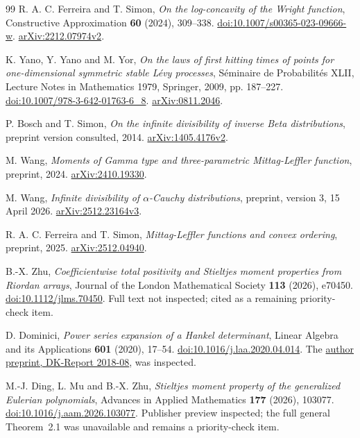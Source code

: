 \documentclass[11pt,a4paper]{article}
\theoremstyle{definition}
\theoremstyle{remark}
\numberwithin{equation}{section}
\begin{document}
\begin{thebibliography}{99}
R. A. C. Ferreira and T. Simon,
\emph{On the log-concavity of the Wright function},
Constructive Approximation \textbf{60} (2024), 309--338.
\href{https://doi.org/10.1007/s00365-023-09666-w}{doi:10.1007/s00365-023-09666-w}.
\href{https://arxiv.org/abs/2212.07974v2}{arXiv:2212.07974v2}.

K. Yano, Y. Yano and M. Yor,
\emph{On the laws of first hitting times of points for one-dimensional
symmetric stable L\'evy processes},
S\'eminaire de Probabilit\'es XLII, Lecture Notes in Mathematics 1979,
Springer, 2009, pp. 187--227.
\href{https://doi.org/10.1007/978-3-642-01763-6_8}{doi:10.1007/978-3-642-01763-6\_8}.
\href{https://arxiv.org/abs/0811.2046}{arXiv:0811.2046}.

P. Bosch and T. Simon,
\emph{On the infinite divisibility of inverse Beta distributions},
preprint version consulted, 2014.
\href{https://arxiv.org/abs/1405.4176v2}{arXiv:1405.4176v2}.

M. Wang,
\emph{Moments of Gamma type and three-parametric Mittag-Leffler function},
preprint, 2024.
\href{https://arxiv.org/abs/2410.19330}{arXiv:2410.19330}.

M. Wang,
\emph{Infinite divisibility of $\alpha$-Cauchy distributions},
preprint, version 3, 15 April 2026.
\href{https://arxiv.org/abs/2512.23164v3}{arXiv:2512.23164v3}.

R. A. C. Ferreira and T. Simon,
\emph{Mittag-Leffler functions and convex ordering}, preprint, 2025.
\href{https://arxiv.org/abs/2512.04940}{arXiv:2512.04940}.

B.-X. Zhu,
\emph{Coefficientwise total positivity and Stieltjes moment properties from
Riordan arrays}, Journal of the London Mathematical Society
\textbf{113} (2026), e70450.
\href{https://doi.org/10.1112/jlms.70450}{doi:10.1112/jlms.70450}.
Full text not inspected; cited as a remaining priority-check item.

D. Dominici,
\emph{Power series expansion of a Hankel determinant},
Linear Algebra and its Applications \textbf{601} (2020), 17--54.
\href{https://doi.org/10.1016/j.laa.2020.04.014}{doi:10.1016/j.laa.2020.04.014}.
The \href{https://www.dk-compmath.jku.at/publications/dk-reports/2018-06-12/at_download/file}{author preprint, DK-Report 2018-08}, was inspected.

M.-J. Ding, L. Mu and B.-X. Zhu,
\emph{Stieltjes moment property of the generalized Eulerian polynomials},
Advances in Applied Mathematics \textbf{177} (2026), 103077.
\href{https://doi.org/10.1016/j.aam.2026.103077}{doi:10.1016/j.aam.2026.103077}.
Publisher preview inspected; the full general Theorem~2.1 was unavailable
and remains a priority-check item.


\end{thebibliography}
\end{document}

